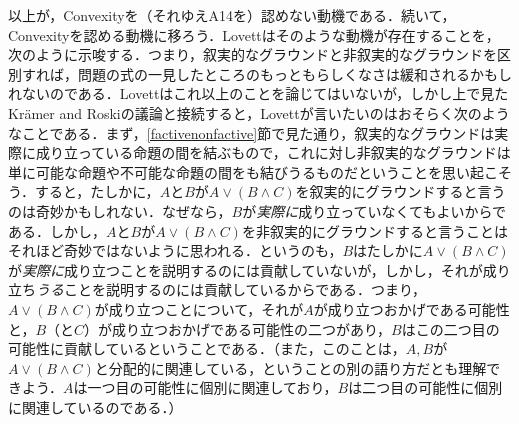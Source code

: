\documentclass[twoside,14Q,uplatex,dvipdfmx]{jsarticle}
\theoremstyle{definition}
\begin{document}
以上が，Convexityを（それゆえA14を）認めない動機である．続いて，Convexityを認める動機に移ろう．Lovett\cite[p.23fn20]{Lovett2020}はそのような動機が存在することを，次のように示唆する．つまり，叙実的なグラウンドと非叙実的なグラウンドを区別すれば，問題の式の一見したところのもっともらしくなさは緩和されるかもしれないのである．Lovettはこれ以上のことを論じてはいないが，しかし上で見たKr\"{a}mer and Roskiの議論と接続すると，Lovettが言いたいのはおそらく次のようなことである．まず，\ref{factivenonfactive}節で見た通り，叙実的なグラウンドは実際に成り立っている命題の間を結ぶもので，これに対し非叙実的なグラウンドは単に可能な命題や不可能な命題の間をも結びうるものだということを思い起こそう．すると，たしかに，$A$と$B$が$A\lor(B\land C)$を叙実的にグラウンドすると言うのは奇妙かもしれない．なぜなら，$B$が\emph{実際に}成り立っていなくてもよいからである．しかし，$A$と$B$が$A\lor(B\land C)$を非叙実的にグラウンドすると言うことはそれほど奇妙ではないように思われる．というのも，$B$はたしかに$A\lor(B\land C)$が\emph{実際に}成り立つことを説明するのには貢献していないが，しかし，それが成り立ち\emph{うる}ことを説明するのには貢献しているからである．つまり，$A\lor(B\land C)$が成り立つことについて，それが$A$が成り立つおかげである可能性と，$B$（と$C$）が成り立つおかげである可能性の二つがあり，$B$はこの二つ目の可能性に貢献しているということである．（また，このことは，$A, B$が$A\lor(B\land C)$と分配的に関連している，ということの別の語り方だとも理解できよう．$A$は一つ目の可能性に個別に関連しており，$B$は二つ目の可能性に個別に関連しているのである．）
\end{document}
